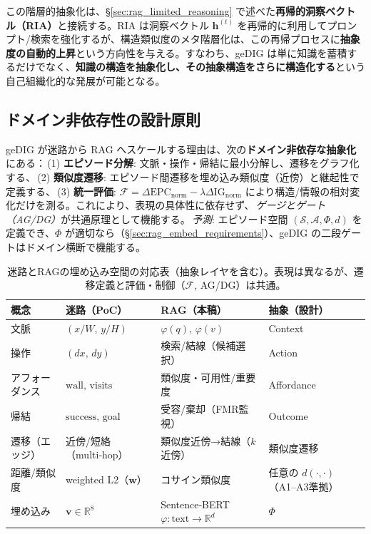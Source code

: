 \documentclass[ja=standard,xelatex]{bxjsarticle}
\newcommand{\F}{\mathcal{F}}
\newcommand{\gednorm}{\Delta\mathrm{EPC}_{\mathrm{norm}}}
\newcommand{\ignorm}{\Delta\mathrm{IG}_{\mathrm{norm}}}
\begin{document}
この階層的抽象化は、\S\ref{sec:rag_limited_reasoning} で述べた\textbf{再帰的洞察ベクトル（RIA）}と接続する。RIA は洞察ベクトル $\mathbf{h}^{(t)}$ を再帰的に利用してプロンプト/検索を強化するが、構造類似度のメタ階層化は、この再帰プロセスに\textbf{抽象度の自動的上昇}という方向性を与える。すなわち、geDIG は単に知識を蓄積するだけでなく、\textbf{知識の構造を抽象化し、その抽象構造をさらに構造化する}という自己組織化的な発展が可能となる。

\subsection{ドメイン非依存性の設計原則}
\label{sec:domain_agnostic_principles}
geDIG が迷路から RAG へスケールする理由は、次の\textbf{ドメイン非依存な抽象化}にある：\,(1) \textbf{エピソード分解}: 文脈・操作・帰結に最小分解し、遷移をグラフ化する、\,(2) \textbf{類似度遷移}: エピソード間遷移を埋め込み類似度（近傍）と継起性で定義する、\,(3) \textbf{統一評価}: $\F=\gednorm-\lambda\ignorm$ により構造/情報の相対変化だけを測る。これにより、表現の具体性に依存せず、\,\emph{ゲージとゲート（AG/DG）}が共通原理として機能する。\,\emph{予測}: エピソード空間 $(\mathcal{S},\mathcal{A},\Phi,d)$ を定義でき、$\Phi$ が適切なら（\S\ref{sec:rag_embed_requirements}）、geDIG の二段ゲートはドメイン横断で機能する。

\begin{table}[H]
\centering
\small
\begin{tabular}{llll}
\toprule
概念 & 迷路（PoC） & RAG（本稿） & 抽象（設計） \\
\midrule
文脈 & $(x/W,\,y/H)$ & $\varphi(q),\,\varphi(v)$ & Context \\
操作 & $(dx,\,dy)$ & 検索/結線（候補選択） & Action \\
アフォーダンス & $\mathrm{wall},\,\mathrm{visits}$ & 類似度・可用性/重要度 & Affordance \\
帰結 & $\mathrm{success},\,\mathrm{goal}$ & 受容/棄却（FMR監視） & Outcome \\
遷移（エッジ） & 近傍/短絡（multi‑hop） & 類似度近傍→結線（$k$近傍） & 類似度遷移 \\
距離/類似度 & weighted L2（$\mathbf{w}$） & コサイン類似度 & 任意の $d(\cdot,\cdot)$（A1–A3準拠） \\
埋め込み & $\mathbf{v}\in\mathbb{R}^8$ & Sentence‑BERT $\varphi:\text{text}\to\mathbb{R}^d$ & $\Phi$ \\
\bottomrule
\end{tabular}
\caption{迷路とRAGの埋め込み空間の対応表（抽象レイヤを含む）。表現は異なるが、遷移定義と評価・制御（$\F$, AG/DG）は共通。}
\label{tab:maze_rag_mapping}
\end{table}
\end{document}
